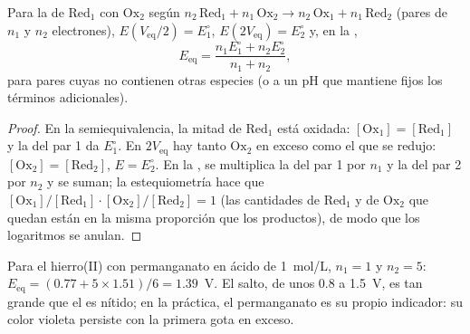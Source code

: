 \begin{proposition}\label{prop:b1:titration-methods:potentiometric-points}
Para la  de $\mathrm{Red_1}$ con $\mathrm{Ox_2}$ según
$n_2\,\mathrm{Red_1} + n_1\,\mathrm{Ox_2} \to n_2\,\mathrm{Ox_1} +
n_1\,\mathrm{Red_2}$ (pares de $n_1$ y $n_2$ electrones), $E(V_{\mathrm{eq}}/2) = E^\circ_1$, $E(2V_{\mathrm{eq}}) =
E^\circ_2$ y, en la ,
\[
  E_{\mathrm{eq}} = \frac{n_1E^\circ_1 + n_2E^\circ_2}{n_1 + n_2},
\]
para pares cuyas  no contienen otras especies (o a un pH
que mantiene fijos los términos adicionales).
\end{proposition}

\begin{proof}
En la semiequivalencia, la mitad de $\mathrm{Red_1}$ está oxidada:
$[\mathrm{Ox_1}] = [\mathrm{Red_1}]$ y la  del par 1 da
$E^\circ_1$. En $2V_{\mathrm{eq}}$ hay tanto $\mathrm{Ox_2}$ en exceso como
el que se redujo: $[\mathrm{Ox_2}] = [\mathrm{Red_2}]$, $E = E^\circ_2$.
En la , se multiplica la  del par 1 por
$n_1$ y la del par 2 por $n_2$ y se suman; la estequiometría hace que
$[\mathrm{Ox_1}]/[\mathrm{Red_1}] \cdot [\mathrm{Ox_2}]/[\mathrm{Red_2}] = 1$
(las cantidades de $\mathrm{Red_1}$ y de $\mathrm{Ox_2}$ que quedan están
en la misma proporción que los productos), de modo que los logaritmos se
anulan.
\end{proof}

Para el hierro(II) con permanganato en ácido de \qty{1}{mol/L}, $n_1 = 1$
y $n_2 =
5$: $E_{\mathrm{eq}} = (0.77 + 5 \times 1.51)/6 = 1.39$~V. El salto, de
unos 0.8 a 1.5~V, es tan grande que el  es nítido; en la
práctica, el permanganato es su propio indicador: su color violeta
persiste con la primera gota en exceso.

